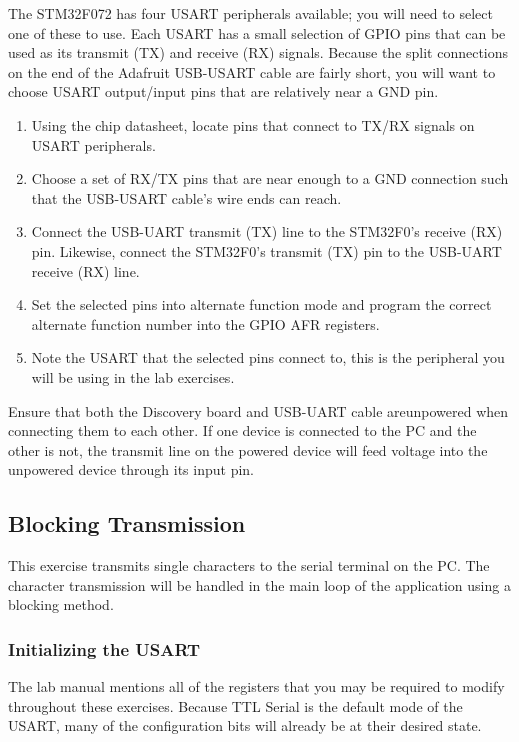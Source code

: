 \documentclass[openany,11pt,fleqn]{book} %
\begin{document}
\begin{exercise}
	The STM32F072 has four USART peripherals available; you will need to select one of these to use. Each USART has a small selection of GPIO pins that can be used as its transmit (TX) and receive (RX) signals. Because the split connections on the end of the Adafruit USB-USART cable are fairly short, you will want to choose USART output/input pins that are relatively near a GND pin.
	 
	 \begin{enumerate}
	     \item Using the chip datasheet, locate pins that connect to TX/RX signals on USART peripherals.
	     \item Choose a set of RX/TX pins that are near enough to a GND connection such that the USB-USART cable's wire ends can reach. 
	     \item Connect the USB-UART transmit (TX) line to the STM32F0's receive (RX) pin. Likewise, connect the  STM32F0's transmit (TX) pin to the USB-UART receive (RX) line.
	     \item Set the selected pins into alternate function mode and program the correct alternate function number into the GPIO AFR registers. 
	     \item Note the USART that the selected pins connect to, this is the peripheral you will be using in the lab exercises.  
	 \end{enumerate}
\end{exercise}

\begin{warning}
    Ensure that both the Discovery board and USB-UART cable areunpowered when connecting them to each other. If one device is connected to the PC and the other is not, the transmit line on the powered device will feed voltage into the unpowered device through its input pin. 
\end{warning}

\subsection{Blocking Transmission}	
This exercise transmits single characters to the serial terminal on the PC. The character transmission will be handled in the main loop of the application using a blocking method. 

\subsubsection{Initializing the USART}
The lab manual mentions all of the registers that you may be required to modify throughout these exercises. Because TTL Serial is the default mode of the USART, many of the configuration bits will already be at their desired state. 
\end{document}
